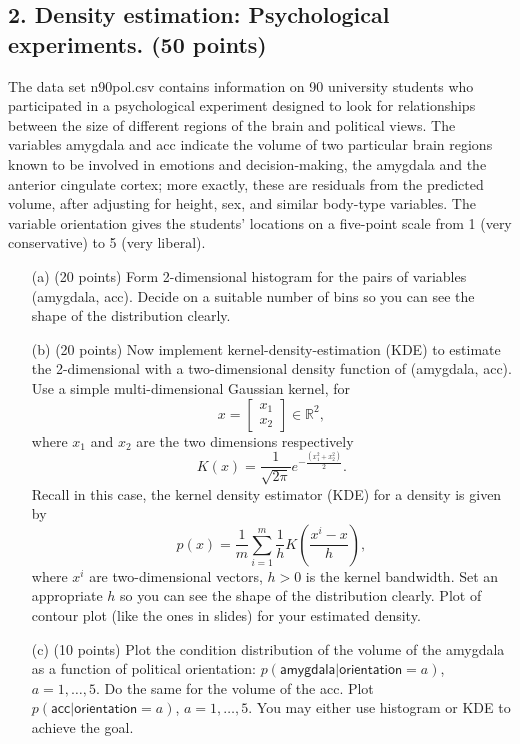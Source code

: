 \documentclass[twoside,12pt]{article}
\begin{document}
\clearpage



\subsection*{2. Density estimation: Psychological experiments. (50 points)}

 The data set \textsf{n90pol.csv} contains information on 90 university students who participated in a psychological experiment designed to look for relationships between the size of different regions of the brain and political views. The variables \textsf{amygdala} and \textsf{acc} indicate the volume of two particular brain regions known to be involved in emotions and decision-making, the amygdala and the anterior cingulate cortex; more exactly, these are residuals from the predicted volume, after adjusting for height, sex, and similar body-type variables. The variable \textsf{orientation} gives the students' locations on a five-point scale from 1 (very conservative) to 5 (very liberal). %
 
 \begin{enumerate}
 \item[(a)] (20 points) Form 2-dimensional histogram for the pairs of variables (\textsf{amygdala}, \textsf{acc}). Decide on a suitable number of bins so you can see the shape of the distribution clearly. 
 
 \item[(b)] (20 points) Now implement kernel-density-estimation (KDE) to estimate the 2-dimensional with a two-dimensional density function of (\textsf{amygdala}, \textsf{acc}). Use a simple multi-dimensional Gaussian kernel, for \[x = \begin{bmatrix}x_1\\x_2\end{bmatrix}\in \mathbb R^2,\] where $x_1$ and $x_2$ are the two dimensions respectively \[K(x) = \frac{1}{\sqrt {2\pi}} e^{-\frac{(x_1^2 + x_2^2)}{2}}.\] Recall in this case, the kernel density estimator (KDE) for a density is given by
 \[
 p(x) = \frac 1 m \sum_{i=1}^m \frac 1 h
 K\left(
 \frac{x^i - x}{h}
 \right),
 \]
 where $x^i$ are two-dimensional vectors, $h >0$ is the kernel bandwidth. Set an appropriate $h$ so you can see the shape of the distribution clearly. Plot of contour plot (like the ones in slides) for your estimated density. 
 \item[(c)] (10 points) Plot the condition distribution of the volume of the \textsf{amygdala} as a function of political \textsf{orientation}: $p(\textsf{amygdala}|\textsf{orientation}=a)$, $a = 1, \ldots, 5$. Do the same for the volume of the 
 \textsf{acc}. Plot $p(\textsf{acc}|\textsf{orientation}=a)$, $a = 1, \ldots, 5$. You may either use histogram or KDE to achieve the goal.
 \end{enumerate}
\end{document}
